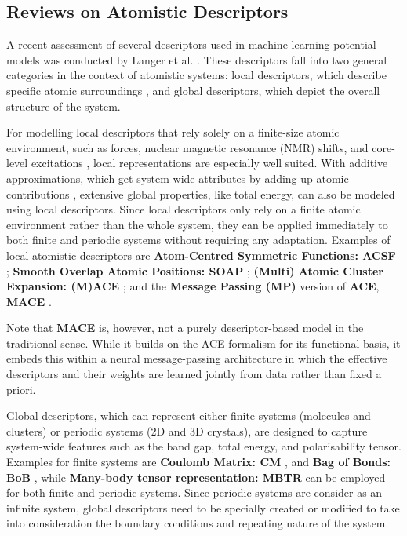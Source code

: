 \subsection{Reviews on Atomistic Descriptors} \label{subsec:2.4.1}
A recent assessment of several descriptors used in machine learning potential models was conducted by Langer et al. \cite{Langer2022}.
These descriptors fall into two general categories in the context of atomistic systems: local descriptors, which describe specific atomic surroundings \cite{Bartk2013}, and global descriptors, which depict the overall structure of the system.

For modelling local descriptors that rely solely on a finite-size atomic environment, such as forces, nuclear magnetic resonance (NMR) shifts, and core-level excitations \cite{Behler2007, Rupp2015}, local representations are especially well suited.
With additive approximations, which get system-wide attributes by adding up atomic contributions \cite{Himanen2020}, extensive global properties, like total energy, can also be modeled using local descriptors.
Since local descriptors only rely on a finite atomic environment rather than the whole system, they can be applied immediately to both finite and periodic systems without requiring any adaptation.
Examples of local atomistic descriptors are \textbf{Atom-Centred Symmetric Functions: ACSF} \cite{Behler2007,Behler2011}; \textbf{Smooth Overlap Atomic Positions: SOAP} \cite{Bartk2013,Bartk2015,Deringer2021}; \textbf{(Multi) Atomic Cluster Expansion: (M)ACE} \cite{Drautz2019, Musil2021, Dusson2022, Witt2023}; and the \textbf{Message Passing (MP)} version of \textbf{ACE}, \textbf{MACE} \cite{https://doi.org/10.48550/arxiv.2206.07697, Batatia2025}.

Note that \textbf{MACE} is, however, not a purely descriptor-based model in the traditional sense. While it builds on the ACE formalism for its functional basis, it embeds this within a neural message-passing architecture in which the effective descriptors and their weights are learned jointly from data rather than fixed a priori.

Global descriptors, which can represent either finite systems (molecules and clusters) or periodic systems (2D and 3D crystals), are designed to capture system-wide features such as the band gap, total energy, and polarisability tensor.
Examples for finite systems are \textbf{Coulomb Matrix: CM} \cite{Rupp2012}, and \textbf{Bag of Bonds: BoB} \cite{Hansen2015}, while \textbf{Many-body tensor representation: MBTR} \cite{Huo2022} can be employed for both finite and periodic systems.
Since periodic systems are consider as an infinite system, global descriptors need to be specially created or modified to take into consideration the boundary conditions and repeating nature of the system.

